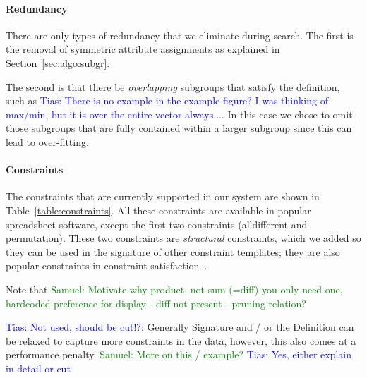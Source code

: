 \documentclass{sig-alternate-05-2015}
\newcommand{\samuel}[1]{\textcolor{green}{{\sc Samuel:} #1}\xspace}
\newcommand{\tias}[1]{\textcolor{blue}{{\sc Tias:} #1}\xspace}
\newcommand{\CSignature}{Signature\xspace}
\newcommand{\CFunction}{Definition\xspace}
\begin{document}
\paragraph{Redundancy}
There are only types of redundancy that we eliminate during search. The first is the removal of symmetric attribute assignments as explained in Section~\ref{sec:algo:subgr}.

The second is that there be \textit{overlapping} subgroups that satisfy the definition, such as \tias{There is no example in the example figure? I was thinking of max/min, but it is over the entire vector always...}.
In this case we chose to omit those subgroups that are fully contained within a larger subgroup since this can lead to over-fitting.

\paragraph{Constraints}
The constraints that are currently supported in our system are shown in Table~\ref{table:constraints}. All these constraints are available in popular spreadsheet software, except the first two constraints (alldifferent and permutation). These two constraints are \textit{structural} constraints, which we added so they can be used in the signature of other constraint templates; they are also popular constraints in constraint satisfaction~\cite{modelseeker}.


Note that \samuel{Motivate why product, not sum (=diff) you only need one, hardcoded preference for display - diff not present - pruning relation?}

\tias{Not used, should be cut!?:}
Generally \CSignature and / or the \CFunction can be relaxed to capture more constraints in the data, however, this also comes at a performance penalty. \samuel{More on this / example?} \tias{Yes, either explain in detail or cut}
\end{document}
